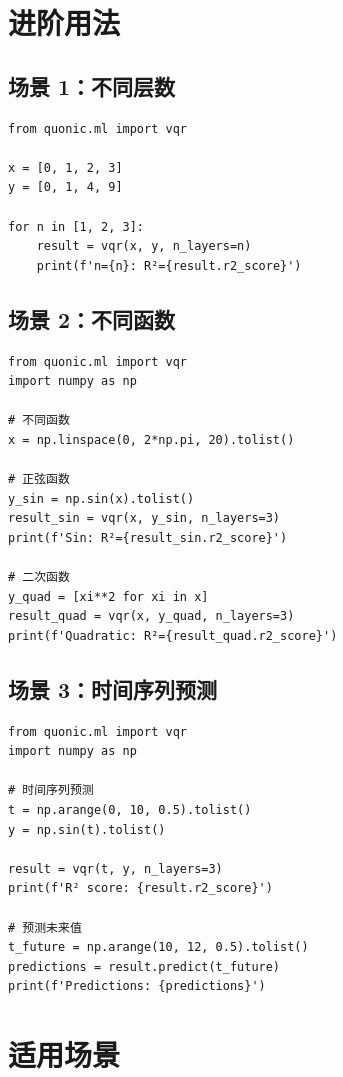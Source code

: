 \documentclass[12pt,a4paper]{article}
\begin{document}
\section{进阶用法}

\subsection{场景 1：不同层数}

\begin{verbatim}
from quonic.ml import vqr

x = [0, 1, 2, 3]
y = [0, 1, 4, 9]

for n in [1, 2, 3]:
    result = vqr(x, y, n_layers=n)
    print(f'n={n}: R²={result.r2_score}')
\end{verbatim}

\subsection{场景 2：不同函数}

\begin{verbatim}
from quonic.ml import vqr
import numpy as np

# 不同函数
x = np.linspace(0, 2*np.pi, 20).tolist()

# 正弦函数
y_sin = np.sin(x).tolist()
result_sin = vqr(x, y_sin, n_layers=3)
print(f'Sin: R²={result_sin.r2_score}')

# 二次函数
y_quad = [xi**2 for xi in x]
result_quad = vqr(x, y_quad, n_layers=3)
print(f'Quadratic: R²={result_quad.r2_score}')
\end{verbatim}

\subsection{场景 3：时间序列预测}

\begin{verbatim}
from quonic.ml import vqr
import numpy as np

# 时间序列预测
t = np.arange(0, 10, 0.5).tolist()
y = np.sin(t).tolist()

result = vqr(t, y, n_layers=3)
print(f'R² score: {result.r2_score}')

# 预测未来值
t_future = np.arange(10, 12, 0.5).tolist()
predictions = result.predict(t_future)
print(f'Predictions: {predictions}')
\end{verbatim}

\section{适用场景}
\end{document}
